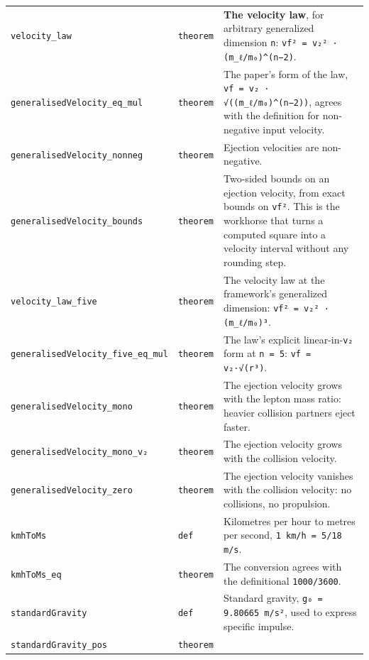 \documentclass[11pt,a4paper]{article}
\begin{document}
\begin{center}
\begin{longtable}{@{}p{}p{}p{}@{}}
\texttt{velocity\_\allowbreak{}law} & \texttt{theorem} & \small \textbf{The velocity law}, for arbitrary generalized dimension \texttt{n}: \texttt{vf² = v₂² · (m\_\allowbreak{}ℓ/m₀)\textasciicircum{}(n−2)}. \\
\texttt{generalisedVelocity\_\allowbreak{}eq\_\allowbreak{}mul} & \texttt{theorem} & \small The paper's form of the law, \texttt{vf = v₂ · √((m\_\allowbreak{}ℓ/m₀)\textasciicircum{}(n−2))}, agrees with the definition for non-negative input velocity. \\
\texttt{generalisedVelocity\_\allowbreak{}nonneg} & \texttt{theorem} & \small Ejection velocities are non-negative. \\
\texttt{generalisedVelocity\_\allowbreak{}bounds} & \texttt{theorem} & \small Two-sided bounds on an ejection velocity, from exact bounds on \texttt{vf²}. This is the workhorse that turns a computed square into a velocity interval without any rounding step. \\
\texttt{velocity\_\allowbreak{}law\_\allowbreak{}five} & \texttt{theorem} & \small The velocity law at the framework's generalized dimension: \texttt{vf² = v₂² · (m\_\allowbreak{}ℓ/m₀)³}. \\
\texttt{generalisedVelocity\_\allowbreak{}five\_\allowbreak{}eq\_\allowbreak{}mul} & \texttt{theorem} & \small The law's explicit linear-in-\texttt{v₂} form at \texttt{n = 5}: \texttt{vf = v₂·√(r³)}. \\
\texttt{generalisedVelocity\_\allowbreak{}mono} & \texttt{theorem} & \small The ejection velocity grows with the lepton mass ratio: heavier collision partners eject faster. \\
\texttt{generalisedVelocity\_\allowbreak{}mono\_\allowbreak{}v₂} & \texttt{theorem} & \small The ejection velocity grows with the collision velocity. \\
\texttt{generalisedVelocity\_\allowbreak{}zero} & \texttt{theorem} & \small The ejection velocity vanishes with the collision velocity: no collisions, no propulsion. \\
\texttt{kmhToMs} & \texttt{def} & \small Kilometres per hour to metres per second, \texttt{1 km/h = 5/18 m/s}. \\
\texttt{kmhToMs\_\allowbreak{}eq} & \texttt{theorem} & \small The conversion agrees with the definitional \texttt{1000/3600}. \\
\texttt{standardGravity} & \texttt{def} & \small Standard gravity, \texttt{g₀ = 9.80665 m/s²}, used to express specific impulse. \\
\texttt{standardGravity\_\allowbreak{}pos} & \texttt{theorem} & \small  \\

\end{longtable}
\end{center}
\end{document}
